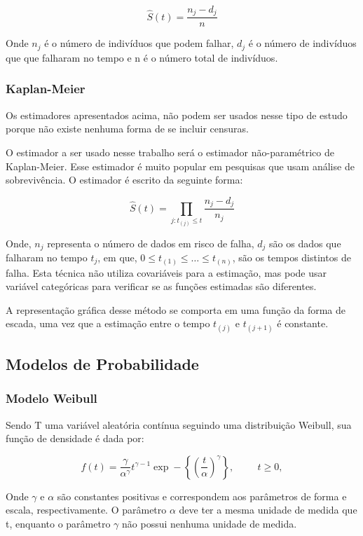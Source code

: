 \documentclass[a4paper,12pt]{article}
\begin{document}
$$ \hat{S}(t) = \dfrac{n_j - d_j}{n} $$

Onde $n_j$ é o número de indivíduos que podem falhar, $d_j$ é o número de indivíduos que que falharam no tempo e n é o número total de indivíduos.

\subsubsection{Kaplan-Meier}

Os estimadores apresentados acima, não podem ser usados nesse tipo de estudo porque não existe nenhuma forma de se incluir censuras.

O estimador a ser usado nesse trabalho será o estimador não-paramétrico de Kaplan-Meier. Esse estimador é muito popular em pesquisas que usam análise de sobrevivência. O estimador é escrito da seguinte forma:

$$ \hat{S}(t) = \prod_{j:t_{(j)}\le t} \dfrac{n_j - d_j}{n_j}$$

Onde, $n_j$ representa o número de dados em risco de falha, $d_j$ são os dados que falharam no tempo $t_j$, em que, $0 \le t_{(1)} \le \hdots \le t_{(n)}$, são os tempos distintos de falha. Esta técnica não utiliza covariáveis para a estimação, mas pode usar variável categóricas para verificar se as funções estimadas são diferentes. 

A representação gráfica desse método se comporta em uma função da forma de escada, uma vez que a estimação entre o tempo $t_{(j)}$ e $t_{(j+1)}$ é constante.


\subsection{Modelos de Probabilidade}

\subsubsection{Modelo Weibull}
Sendo T uma variável aleatória contínua seguindo uma distribuição Weibull, sua função de densidade é dada por:

$$ f(t) = \dfrac{\gamma}{\alpha^{\gamma}}t^{\gamma-1}\exp-\left\lbrace\left(\dfrac{t}{\alpha}\right)^{\gamma}\right\rbrace, \hspace{1cm} t \ge 0,$$

Onde $\gamma$ e $\alpha$ são constantes positivas e correspondem aos parâmetros de forma e escala, respectivamente. O parâmetro $\alpha$ deve ter a mesma unidade de medida que t, enquanto o parâmetro $\gamma$ não possui nenhuma unidade de medida.
\end{document}
